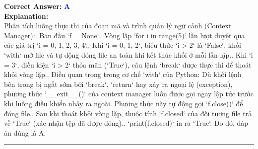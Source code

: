 \documentclass[11pt,a4paper]{article}
\begin{document}
\begin{minipage}{\textwidth}
\noindent \textbf{Correct Answer:} \textcolor{blue}{\textbf{A}} \\[4pt]
\noindent \textbf{Explanation:}\\
Phân tích luồng thực thi của đoạn mã và trình quản lý ngữ cảnh (Context Manager):. Ban đầu `f = None`.. Vòng lặp `for i in range(5)` lần lượt duyệt qua các giá trị `i = 0, 1, 2, 3, 4`.. Khi `i = 0, 1, 2`, biểu thức `i > 2` là `False`, khối `with` mở file và tự động đóng file an toàn khi kết thúc khối ở mỗi lần lặp.. Khi `i = 3`, điều kiện `i > 2` thỏa mãn (`True`), câu lệnh `break` được thực thi để thoát khỏi vòng lặp.. Điều quan trọng trong cơ chế `with` của Python: Dù khối lệnh bên trong bị ngắt sớm bởi `break`, `return` hay xảy ra ngoại lệ (exception), phương thức `__exit__()` của context manager luôn được gọi ngay lập tức trước khi luồng điều khiển nhảy ra ngoài. Phương thức này tự động gọi `f.close()` để đóng file.. Sau khi thoát khỏi vòng lặp, thuộc tính `f.closed` của đối tượng file trả về `True` (xác nhận tệp đã được đóng).. `print(f.closed)` in ra `True`.\newline
Do đó, đáp án đúng là A.
\end{minipage}
\vspace{0.8cm}
\hrule
\vspace{0.5cm}
\end{document}
